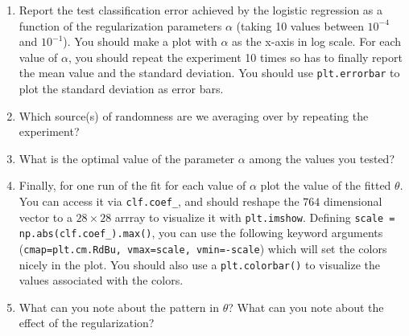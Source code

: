 \documentclass{article}
\begin{document}
\begin{enumerate}
\setcounter{enumi}{\value{saveenum}}
  \item Report the test classification error achieved by the logistic regression as a function of the regularization parameters $\alpha$ (taking 10 values between $10^{-4}$ and $10^{-1}$). You should make a plot with $\alpha$ as the x-axis in log scale. For each value of $\alpha$, you should repeat the experiment 10 times so has to finally report the mean value and the standard deviation. You should use \texttt{plt.errorbar} to plot the standard deviation as error bars.
  
  \item Which source(s) of randomness are we averaging over by repeating the experiment?

  
  \item What is the optimal value of the parameter $\alpha$ among the values you tested? 

  \item Finally, for one run of the fit for each value of $\alpha$ plot the value of the fitted $\theta$. You can access it via \texttt{clf.coef\_}, and should reshape the $764$ dimensional vector to a $28\times 28$ arrray to visualize it with \texttt{plt.imshow}. Defining \texttt{scale = np.abs(clf.coef\_).max()}, you can use the following keyword arguments (\texttt{cmap=plt.cm.RdBu, vmax=scale, vmin=-scale}) which will set the colors nicely in the plot. You should also use a \texttt{plt.colorbar()} to visualize the values associated with the colors.
  
  \item What can you note about the pattern in $\theta$? What can you note about the effect of the regularization?

  
\setcounter{saveenum}{\value{enumi}}
\end{enumerate}
\end{document}
